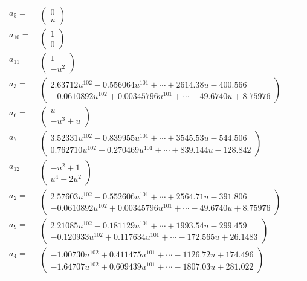 \documentclass[1p]{elsarticle_modified}
\theoremstyle{definition}
\begin{document}
\begin{tabular}{m{7pt} m{180pt} m{7pt} m{180pt} }
\flushright $a_{5}=$&$\begin{pmatrix}0\\u\end{pmatrix}$ \\
\flushright $a_{10}=$&$\begin{pmatrix}1\\0\end{pmatrix}$ \\
\flushright $a_{11}=$&$\begin{pmatrix}1\\- u^2\end{pmatrix}$ \\
\flushright $a_{3}=$&$\begin{pmatrix}2.63712 u^{102}-0.556064 u^{101}+\cdots+2614.38 u-400.566\\-0.0610892 u^{102}+0.00345796 u^{101}+\cdots-49.6740 u+8.75976\end{pmatrix}$ \\
\flushright $a_{6}=$&$\begin{pmatrix}u\\- u^3+u\end{pmatrix}$ \\
\flushright $a_{7}=$&$\begin{pmatrix}3.52331 u^{102}-0.839955 u^{101}+\cdots+3545.53 u-544.506\\0.762710 u^{102}-0.270469 u^{101}+\cdots+839.144 u-128.842\end{pmatrix}$ \\
\flushright $a_{12}=$&$\begin{pmatrix}- u^2+1\\u^4-2 u^2\end{pmatrix}$ \\
\flushright $a_{2}=$&$\begin{pmatrix}2.57603 u^{102}-0.552606 u^{101}+\cdots+2564.71 u-391.806\\-0.0610892 u^{102}+0.00345796 u^{101}+\cdots-49.6740 u+8.75976\end{pmatrix}$ \\
\flushright $a_{9}=$&$\begin{pmatrix}2.21085 u^{102}-0.181129 u^{101}+\cdots+1993.54 u-299.459\\-0.120933 u^{102}+0.117634 u^{101}+\cdots-172.565 u+26.1483\end{pmatrix}$ \\
\flushright $a_{4}=$&$\begin{pmatrix}-1.00730 u^{102}+0.411475 u^{101}+\cdots-1126.72 u+174.496\\-1.64707 u^{102}+0.609439 u^{101}+\cdots-1807.03 u+281.022\end{pmatrix}$ \\

\end{tabular}
\end{document}
